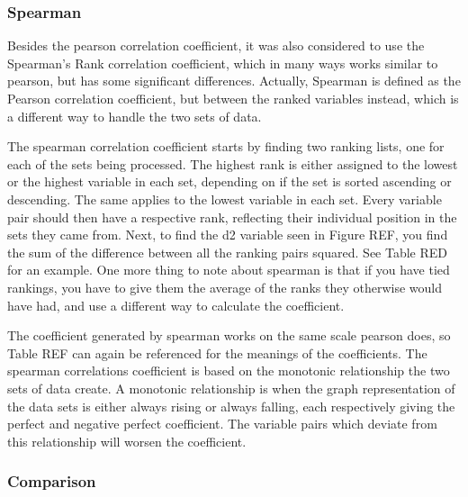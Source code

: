 \subsubsection{Spearman}

Besides the pearson correlation coefficient, it was also considered to use the Spearman’s Rank correlation coefficient, which in many ways works similar to pearson, but has some significant differences. Actually, Spearman is defined as the Pearson correlation coefficient, but between the ranked variables instead, which is a different way to handle the two sets of data.



The spearman correlation coefficient starts by finding two ranking lists, one for each of the sets being processed. The highest rank is either assigned to the lowest or the highest variable in each set, depending on if the set is sorted ascending or descending. The same applies to the lowest variable in each set. Every variable pair should then have a respective rank, reflecting their individual position in the sets they came from. Next, to find the d2 variable seen in Figure REF, you find the sum of the difference between all the ranking pairs squared. See Table RED for an example. One more thing to note about spearman is that if you have tied rankings, you have to give them the average of the ranks they otherwise would have had, and use a different way to calculate the coefficient.



The coefficient generated by spearman works on the same scale pearson does, so Table REF can again be referenced for the meanings of the coefficients. The spearman correlations coefficient is based on the monotonic relationship the two sets of data create. A monotonic relationship is when the graph representation of the data sets is either always rising or always falling, each respectively giving the perfect and negative perfect coefficient. The variable pairs which deviate from this relationship will worsen the coefficient.

\subsubsection{Comparison}

